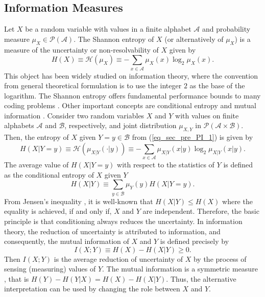 \subsection{Information Measures}
Let $X$ be a random variable with values in a finite alphabet $\mathcal{A}$ and probability measure $\mu_{X} \in \mathcal{P}(\mathcal{A})$. The { Shannon entropy} of $X$ \citep{shannon_1948} (or alternatively of $\mu_X$) is a measure of the uncertainty or non-resolvability of $X$ given by
\begin{equation}\label{eq_sec_pre_PI_1}
	H(X) \equiv \mathcal{H}(\mu_X) \equiv - \sum_{x\in \mathcal{A}} \mu_X (x) \log_2 \mu_X (x). 
\end{equation}
This object has been widely studied on information theory, where the convention from general theoretical formulation is to use the integer $2$ as the base of the logarithm.  The Shannon entropy offers fundamental performance bounds to many coding problems \citep{cover_2006}. Other important concepts are conditional entropy and mutual information \citep{cover_2006}. Consider two random variables $X$ and $Y$ with values on finite alphabets  $\mathcal{A}$ and  $\mathcal{B}$, respectively, and joint distribution $\mu_{X,Y}$ in $\mathcal{P}(\mathcal{A}\times\mathcal{B})$. Then, the entropy of $X$ given $Y=y \in \mathcal{B}$ 
from (\ref{eq_sec_pre_PI_1}) is given by
\begin{equation}\label{eq_sec_pre_PI_2}
	H(X|Y=y) \equiv  \mathcal{H}(\mu_{X|Y} (\cdot|y)) \equiv - \sum_{x\in \mathcal{A}} \mu_{X|Y} (x|y) \log_2 \mu_{X|Y} (x|y).
\end{equation}
The average value of $H(X|Y=y)$ \citep{cover_2006} with respect to the statistics of $Y$ is defined as the conditional entropy of $X$ given $Y$
\begin{equation}\label{eq_sec_pre_PI_3}
	H(X|Y) \equiv \sum_{y\in \mathcal{B}} \mu_{Y} (y) H(X|Y=y).
\end{equation}
From {Jensen's inequality} \citep{cover_2006}, it is well-known that $H(X|Y) \leq H(X)$  
where the equality  is achieved, if and only if, $X$ and $Y$ are independent.  
Therefore, the basic principle is that conditioning always reduces the uncertainty. In information theory, the reduction of uncertainty is attributed to information, and consequently, the mutual information 
of $X$ and $Y$ is defined precisely by
\begin{equation}\label{eq_sec_pre_PI_4}
	I(X;Y) \equiv H(X) - H(X|Y) \geq 0. 
\end{equation}
Then $I(X; Y)$ is the average reduction of uncertainty of $X$ by the process of sensing (measuring) values of $Y$. {The mutual information is a symmetric measure \citep{cover_2006}, that is $H(Y) - H(Y|X)= H(X) - H(X|Y)$. Thus, the alternative interpretation can be used by changing the role between $X$ and $Y$}.


